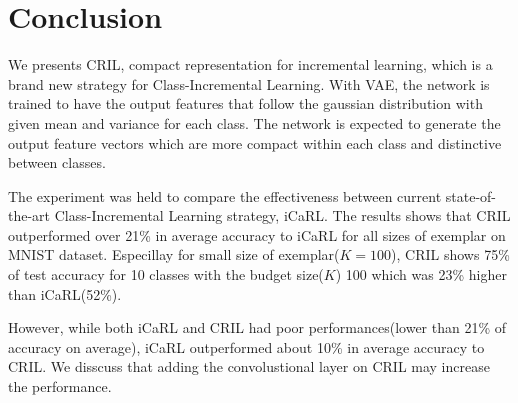 \section{Conclusion}
\label{sec:conclusion}

We presents CRIL, compact representation for incremental learning, which is a brand new strategy for Class-Incremental Learning. With VAE, the network is trained to have the output features that follow the gaussian distribution with given mean and variance for each class. The network is expected to generate the output feature vectors which are more compact within each class and distinctive between classes.

The experiment was held to compare the effectiveness between current state-of-the-art Class-Incremental Learning strategy, iCaRL. The results shows that CRIL outperformed over 21\% in average accuracy to iCaRL for all sizes of exemplar on MNIST dataset. Especillay for small size of exemplar($K=100$), CRIL shows 75\% of test accuracy for 10 classes with the budget size($K$) 100 which was 23\% higher than iCaRL(52\%).

However, while both iCaRL and CRIL had poor performances(lower than 21\% of accuracy on average), iCaRL outperformed about 10\% in average accuracy to CRIL. We disscuss that adding the convolustional layer on CRIL may increase the performance.


